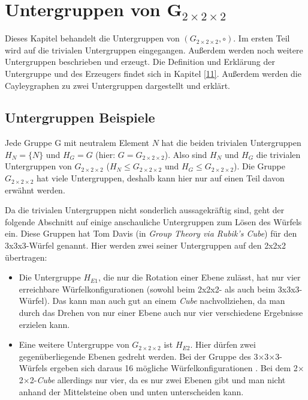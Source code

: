 \documentclass[12pt,a4paper, usenames, dvipsnames]{article}
\theoremstyle{mystyle}
\theoremstyle{definition}
\newcommand{\Gtwo}{\ensuremath{G_{2\times 2\times 2}}}
\newcommand{\Ttwo}{2$\times$2$\times$2-}
\newcommand{\Tthree}{3$\times$3$\times$3-}
\begin{document}
%
%
%
%
%
%
%
%
%
%
%
%
%
%
%
%
%
%
%
%
\newpage

\section{Untergruppen von G$_{2\times 2\times 2}$}

Dieses Kapitel behandelt die Untergruppen von $(\Gtwo, \circ)$. Im ersten Teil wird auf die trivialen Untergruppen eingegangen. Außerdem werden noch weitere Untergruppen beschrieben und erzeugt.
Die Definition und Erklärung der Untergruppe und des Erzeugers findet sich in Kapitel \ref{11}.
Außerdem werden die Cayleygraphen zu zwei Untergruppen dargestellt und erklärt.

%
%
%
%
%
%
%
%
%
%
%
%
%
%
%
%
%
%
%
%
\subsection*{Untergruppen Beispiele}



Jede Gruppe G mit neutralem Element $N$ hat die beiden trivialen Untergruppen ${H_N = \{N\}}$ und $H_G=G$ (hier: $G=\Gtwo$). Also sind $H_N$ und $H_G$ die trivialen Untergruppen von $\Gtwo$ ($H_N \leqslant \Gtwo$ und $H_G \leqslant \Gtwo$).
Die Gruppe $\Gtwo$ hat viele Untergruppen, deshalb kann hier nur auf einen Teil davon erwähnt werden. 


Da die trivialen Untergruppen nicht sonderlich aussagekräftig sind, geht der folgende Abschnitt auf einige anschauliche Untergruppen zum Lösen des Würfels ein. Diese Gruppen hat Tom Davis (in  \textit{Group Theory via Rubik's Cube}) \cite{TD} für den 3x3x3-Würfel genannt. Hier werden zwei seiner Untergruppen auf den 2x2x2 übertragen: 
\begin{itemize}
\item Die Untergruppe $H_{E1}$, die nur die Rotation einer Ebene zulässt, hat nur vier erreichbare Würfelkonfigurationen (sowohl beim 2x2x2- als auch beim 3x3x3-Würfel). Das kann man auch gut an einem \textit{Cube} nachvollziehen, da man durch das Drehen von nur einer Ebene auch nur vier verschiedene Ergebnisse erzielen kann.
\item Eine weitere Untergruppe von $\Gtwo$ ist $H_{E2}$. Hier dürfen zwei gegenüberliegende Ebenen gedreht werden. 
Bei der Gruppe des \Tthree Würfels ergeben sich daraus 16 mögliche Würfelkonfigurationen \cite{TD}. Bei dem \Ttwo \textit{Cube} allerdings nur vier, da es nur zwei Ebenen gibt und man nicht anhand der Mittelsteine oben und unten unterscheiden kann.
\end{itemize}
\end{document}
